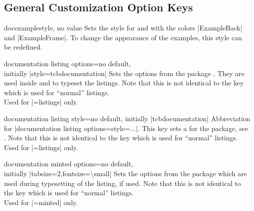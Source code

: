 \clearpage
\subsection{General Customization Option Keys}

\begin{docTcbKey}[][doc updated=2015-03-16]{docexample}{}{style, no value}
  Sets the style for  and 
  with the colors |ExampleBack| and |ExampleFrame|.
  To change the appearance of the examples, this style can be
  redefined.
\begin{dispListing}
\end{dispListing}
\end{docTcbKey}

\begin{docTcbKey}{documentation listing options}{=}{no default,\\\hspace*{\fill} initially |style=tcbdocumentation|}
  Sets the options from the package  \cite{hoffmann:listings}.
  They are used inside  and  to typeset
  the listings. Note that this is not identical to the key
   which is used for \enquote{normal} listings.\\
  Used for |=listings| only.
\end{docTcbKey}

\begin{docTcbKey}{documentation listing style}{=}{no default, initially |tcbdocumentation|}
  Abbreviation for |documentation listing options={style=...}|.
  This key sets a 
  for the  package, see \cite{hoffmann:listings}.
  Note that this is not identical to the key
   which is used for \enquote{normal} listings.\\
  Used for |=listings| only.
\end{docTcbKey}

\begin{docTcbKey}{documentation minted options}{=}{no default,\\\hspace*{\fill} initially |tabsize=2,fontsize=\textbackslash small|}
  Sets the options from the package  \cite{poore:minted}
  which are used during typesetting of the listing, if used.
  Note that this is not identical to the key
   which is used for \enquote{normal} listings.\\
  Used for |=minted| only.
\end{docTcbKey}

